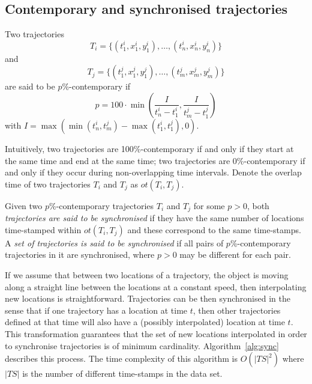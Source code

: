 \subsection{Contemporary and synchronised trajectories}

\begin{definition}
Two trajectories
\[T_i = \{ (t^i_1,x^i_1,y^i_1), \ldots, (t^i_n,x^i_n,y^i_n)\} \]
and
\[T_j = \{ (t^j_1,x^j_1,y^j_1), \ldots, (t^j_m,x^j_m,y^j_m)\} \]
are said to be $p$\%-contemporary if
\[ p = 100 \cdot \min( \frac{I}{t^i_n-t^i_1}, \frac{I}{t^j_m-t^j_1}) \]
with $I = \max(\min(t^i_n,t^j_m) - \max(t^i_1,t^j_1), 0)$.
\end{definition}

Intuitively, two trajectories are 100\%-contemporary if and only if they
start at the same time and end at the same time; two trajectories are
0\%-contemporary if and only if they occur during
non-overlapping time intervals. Denote the overlap time of two trajectories
$T_i$ and $T_j$ as $ot(T_i,T_j)$.

\begin{definition}
Given two $p$\%-contemporary trajectories $T_i$ and $T_j$ for some $p > 0$, both
\emph{trajectories are said to be synchronised} if they have the same number
of locations time-stamped within $ot(T_i,T_j)$ and these correspond to the same
time-stamps. A \emph{set of trajectories is said to be synchronised} if all
pairs of $p$\%-contemporary trajectories in it are
synchronised, where $p>0$ may be different for each pair.
\end{definition}

If we assume that between two locations of a trajectory, the
object is moving along a straight line between the locations at a constant
speed, then interpolating new locations is
straightforward. Trajectories can be then synchronised in the sense that if
one trajectory has a location at time $t$, then other trajectories defined
at that time will also have a (possibly interpolated) location at time $t$.
This transformation
guarantees that the set of new locations interpolated in order to
synchronise trajectories is of minimum cardinality.
Algorithm~\ref{alg:sync} describes
this process.
The time complexity of this algorithm is $O(|TS|^2)$ where $|TS|$
is the number of different time-stamps in the data set.


